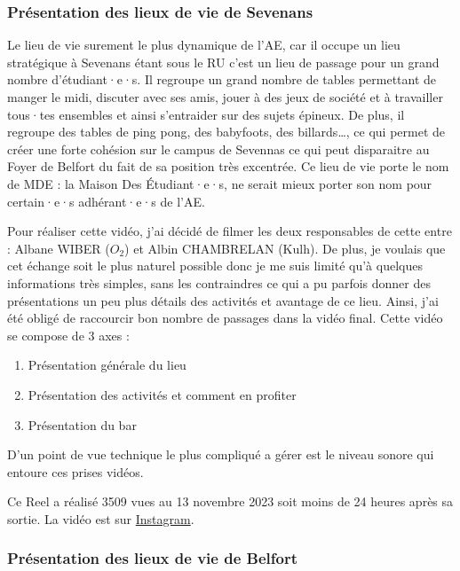 \subsubsection{Présentation des lieux de vie de Sevenans}\label{subsubsec:MDE}

Le lieu de vie surement le plus dynamique de l'\gls{AE}, car il occupe un lieu stratégique à Sevenans étant sous le RU c'est un lieu de passage pour un grand nombre d'étudiant·e·s.
Il regroupe un grand nombre de tables permettant de manger le midi, discuter avec ses amis, jouer à des jeux de société et à travailler tous·tes ensembles et ainsi s'entraider sur des sujets épineux.
De plus, il regroupe des tables de ping pong, des babyfoots, des billards\ldots, ce qui permet de créer une forte cohésion sur le campus de Sevennas ce qui peut disparaitre au Foyer de Belfort du fait de sa position très excentrée.
Ce lieu de vie porte le nom de MDE : la Maison Des Étudiant·e·s, ne serait mieux porter son nom pour certain·e·s adhérant·e·s de l'\gls{AE}.

Pour réaliser cette vidéo, j'ai décidé de filmer les deux responsables de cette entre : Albane WIBER ($O_2$) et Albin CHAMBRELAN (Kulh).
De plus, je voulais que cet échange soit le plus naturel possible donc je me suis limité qu'à quelques informations très simples, sans les contraindres ce qui a pu parfois donner des présentations un peu plus détails des activités et avantage de ce lieu.
Ainsi, j'ai été obligé de raccourcir bon nombre de passages dans la vidéo final.
Cette vidéo se compose de 3 axes :
\begin{enumerate}
    \item Présentation générale du lieu
    \item Présentation des activités et comment en profiter
    \item Présentation du bar
\end{enumerate}

D'un point de vue technique le plus compliqué a gérer est le niveau sonore qui entoure ces prises vidéos.

Ce Reel a réalisé 3509 vues au 13 novembre 2023 soit moins de 24 heures après sa sortie.
La vidéo est sur \href{https://www.instagram.com/reel/CzjfX8Xs5X1/?utm_source=ig_web_copy_link&igshid=MzRlODBiNWFlZA==}{Instagram}.


\subsubsection{Présentation des lieux de vie de Belfort}


